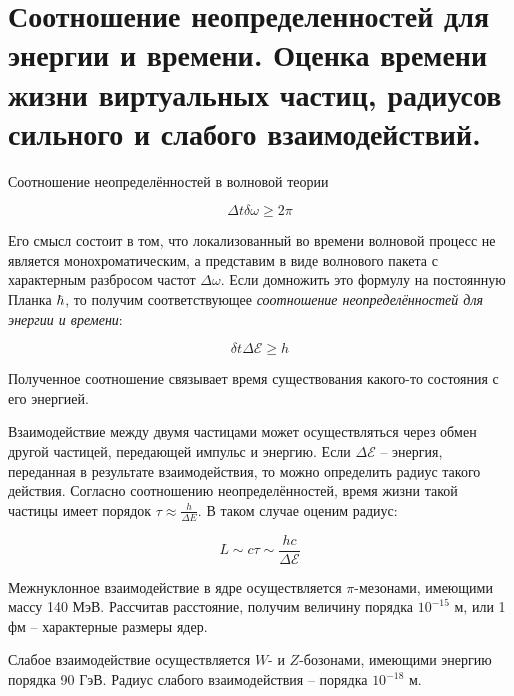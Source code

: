 \section{Соотношение неопределенностей для энергии и времени. Оценка времени жизни виртуальных частиц, радиусов сильного и слабого взаимодействий.}

Соотношение неопределённостей в волновой теории

\begin{equation}
    \Delta t \delta \omega \geq 2 \pi
\end{equation}

\noindent
Его смысл состоит в том, что локализованный во времени волновой процесс не является монохроматическим, а представим в виде волнового пакета с характерным разбросом частот $\Delta \omega$. Если домножить это формулу на постоянную Планка $\hbar$, то получим соответствующее \textit{соотношение неопределённостей для энергии и времени}:

\begin{equation}
    \delta t \Delta \mathcal{E} \geq h
\end{equation}

\noindent
Полученное соотношение связывает время существования какого-то состояния с его энергией.

Взаимодействие между двумя частицами может осуществляться через обмен другой частицей, передающей импульс и энергию. Если $\Delta \mathcal{E}$ -- энергия, переданная в результате взаимодействия, то можно определить радиус такого действия. Согласно соотношению неопределённостей, время жизни такой частицы имеет порядок $\tau \approx \frac{h}{\Delta E}$. В таком случае оценим радиус:

\begin{equation}
    L \sim c \tau \sim \frac{h c}{\Delta \mathcal{E}}
\end{equation}

Межнуклонное взаимодействие в ядре осуществляется $\pi$-мезонами, имеющими массу 140 МэВ. Рассчитав расстояние, получим величину порядка $10^{-15}$ м, или 1 фм -- характерные размеры ядер.

Слабое взаимодействие осуществляется $W$- и $Z$-бозонами, имеющими энергию порядка 90 ГэВ. Радиус слабого взаимодействия -- порядка $10^{-18}$ м.
